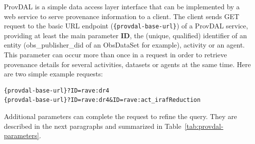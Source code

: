 ProvDAL is a simple data access layer interface \citep[see DALI specification of the VO, ][]{std:DALI} that can be implemented by a web service to serve provenance information to a client.
The client sends GET request to the basic URL endpoint (\texttt{\{provdal-base-url\}}) of a ProvDAL service, providing at least the main parameter {\bf ID}, the (unique, qualified) identifier of an entity (obs\_publisher\_did of an ObsDataSet for example), activity or an agent. This parameter can occur more than once in a request in order to retrieve provenance details for several activities, datasets or agents at the same time. Here are two simple example requests:

\begin{verbatim}
{provdal-base-url}?ID=rave:dr4
{provdal-base-url}?ID=rave:dr4&ID=rave:act_irafReduction
\end{verbatim}
\noindent
Additional parameters can complete the request to refine the query. They are described in the next paragraphs and summarized in Table~\ref{tab:provdal-parameters}.

